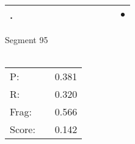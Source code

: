 \documentclass[landscape]{article}
\newcommand{\ssp}{\hspace{2pt}}
\newcommand{\mex}{\cellcolor{g}$\bullet$}
\begin{document}
\begin{tabular}{|l|p{10pt}|p{10pt}|p{10pt}|p{10pt}|p{10pt}|p{10pt}|p{10pt}|p{10pt}|p{10pt}|p{10pt}|p{10pt}|}
\hline
\ssp \cellcolor{ref10}. \ssp&\hspace{2pt}&\hspace{2pt}&\hspace{2pt}&\hspace{2pt}&\hspace{2pt}&\hspace{2pt}&\hspace{2pt}&\hspace{2pt}&\hspace{2pt}&\hspace{2pt}&\hspace{2pt}\mex\\
\hline
\end{tabular}

\vspace{6pt}
\noindent Segment 95\\\\
\noindent\begin{tabular}{lm{12pt}r}
\hline
P:&&0.381\\
R:&&0.320\\
Frag:&&0.566\\
Score:&&0.142\\
\end{tabular}

\newpage
\end{document}
